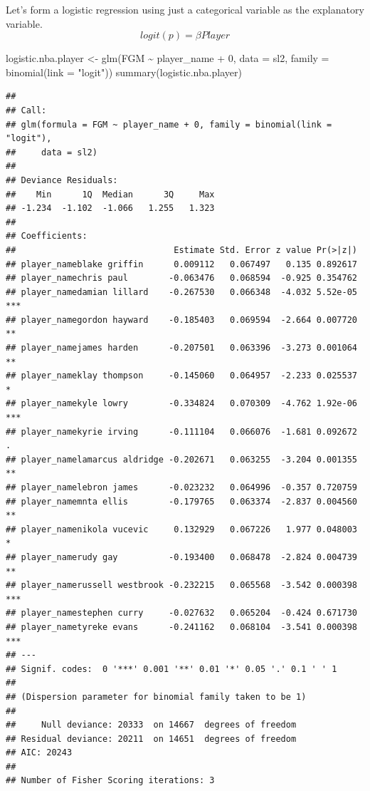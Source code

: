 \documentclass[
]{book}
\newenvironment{Shaded}{\begin{snugshade}}{\end{snugshade}}
\newcommand{\AttributeTok}[1]{\textcolor[rgb]{0.77,0.63,0.00}{#1}}
\newcommand{\DecValTok}[1]{\textcolor[rgb]{0.00,0.00,0.81}{#1}}
\newcommand{\FunctionTok}[1]{\textcolor[rgb]{0.00,0.00,0.00}{#1}}
\newcommand{\NormalTok}[1]{#1}
\newcommand{\OtherTok}[1]{\textcolor[rgb]{0.56,0.35,0.01}{#1}}
\newcommand{\SpecialCharTok}[1]{\textcolor[rgb]{0.00,0.00,0.00}{#1}}
\newcommand{\StringTok}[1]{\textcolor[rgb]{0.31,0.60,0.02}{#1}}
\theoremstyle{definition}
\theoremstyle{definition}
\theoremstyle{definition}
\theoremstyle{definition}
\theoremstyle{remark}
\begin{document}
Let's form a logistic regression using just a categorical variable as the explanatory variable.
\[
logit(p)=\beta Player
\]

\begin{Shaded}
\begin{Highlighting}[]
\NormalTok{logistic.nba.player }\OtherTok{\textless{}{-}} \FunctionTok{glm}\NormalTok{(FGM }\SpecialCharTok{\textasciitilde{}}\NormalTok{ player\_name }\SpecialCharTok{+} \DecValTok{0}\NormalTok{, }\AttributeTok{data =}\NormalTok{ sl2, }\AttributeTok{family =} \FunctionTok{binomial}\NormalTok{(}\AttributeTok{link =} \StringTok{"logit"}\NormalTok{))}
\FunctionTok{summary}\NormalTok{(logistic.nba.player)}
\end{Highlighting}
\end{Shaded}

\begin{verbatim}
## 
## Call:
## glm(formula = FGM ~ player_name + 0, family = binomial(link = "logit"), 
##     data = sl2)
## 
## Deviance Residuals: 
##    Min      1Q  Median      3Q     Max  
## -1.234  -1.102  -1.066   1.255   1.323  
## 
## Coefficients:
##                               Estimate Std. Error z value Pr(>|z|)    
## player_nameblake griffin      0.009112   0.067497   0.135 0.892617    
## player_namechris paul        -0.063476   0.068594  -0.925 0.354762    
## player_namedamian lillard    -0.267530   0.066348  -4.032 5.52e-05 ***
## player_namegordon hayward    -0.185403   0.069594  -2.664 0.007720 ** 
## player_namejames harden      -0.207501   0.063396  -3.273 0.001064 ** 
## player_nameklay thompson     -0.145060   0.064957  -2.233 0.025537 *  
## player_namekyle lowry        -0.334824   0.070309  -4.762 1.92e-06 ***
## player_namekyrie irving      -0.111104   0.066076  -1.681 0.092672 .  
## player_namelamarcus aldridge -0.202671   0.063255  -3.204 0.001355 ** 
## player_namelebron james      -0.023232   0.064996  -0.357 0.720759    
## player_namemnta ellis        -0.179765   0.063374  -2.837 0.004560 ** 
## player_namenikola vucevic     0.132929   0.067226   1.977 0.048003 *  
## player_namerudy gay          -0.193400   0.068478  -2.824 0.004739 ** 
## player_namerussell westbrook -0.232215   0.065568  -3.542 0.000398 ***
## player_namestephen curry     -0.027632   0.065204  -0.424 0.671730    
## player_nametyreke evans      -0.241162   0.068104  -3.541 0.000398 ***
## ---
## Signif. codes:  0 '***' 0.001 '**' 0.01 '*' 0.05 '.' 0.1 ' ' 1
## 
## (Dispersion parameter for binomial family taken to be 1)
## 
##     Null deviance: 20333  on 14667  degrees of freedom
## Residual deviance: 20211  on 14651  degrees of freedom
## AIC: 20243
## 
## Number of Fisher Scoring iterations: 3
\end{verbatim}
\end{document}
